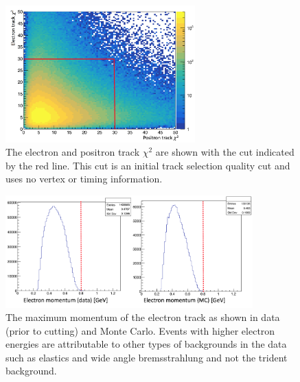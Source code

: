 \begin{figure}[htb]
  \centering
      \includegraphics[width=0.65\textwidth]{pics/searching/trkChi2.png}
  \caption[Track $\chi^2$ cut]{The electron and positron track $\chi^2$ are shown with the cut indicated by the red line. This cut is an initial track selection quality cut and uses no vertex or timing information.}
  \label{fig:trkChi2}
\end{figure} 
\begin{figure}[htb]
  \centering
      \includegraphics[width=0.85\textwidth]{pics/searching/emTrkPmax.png}
  \caption[Maximum $e^-$ track momentum]{The maximum momentum of the electron track as shown in data (prior to cutting) and Monte Carlo. Events with higher electron energies are attributable to other types of backgrounds in the data such as elastics and wide angle bremsstrahlung and not the trident background.}
  \label{fig:emTrkPmax}
\end{figure} 

